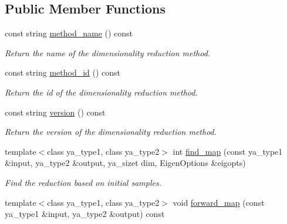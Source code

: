 \subsection*{Public Member Functions}
\begin{CompactItemize}
\item 
\hypertarget{class_y_a_m_d_s_reduce_a2}{
const string \hyperlink{class_y_a_m_d_s_reduce_a2}{method\_\-name} () const }
\label{class_y_a_m_d_s_reduce_a2}

\begin{CompactList}\small\item\em Return the name of the dimensionality reduction method. \item\end{CompactList}\item 
\hypertarget{class_y_a_m_d_s_reduce_a3}{
const string \hyperlink{class_y_a_m_d_s_reduce_a3}{method\_\-id} () const }
\label{class_y_a_m_d_s_reduce_a3}

\begin{CompactList}\small\item\em Return the id of the dimensionality reduction method. \item\end{CompactList}\item 
\hypertarget{class_y_a_m_d_s_reduce_a4}{
const string \hyperlink{class_y_a_m_d_s_reduce_a4}{version} () const }
\label{class_y_a_m_d_s_reduce_a4}

\begin{CompactList}\small\item\em Return the version of the dimensionality reduction method. \item\end{CompactList}\item 
template$<$class ya\_\-type1, class ya\_\-type2$>$ int \hyperlink{class_y_a_m_d_s_reduce_a5}{find\_\-map} (const ya\_\-type1 \&input, ya\_\-type2 \&output, ya\_\-sizet dim, Eigen\-Options \&eigopts)
\begin{CompactList}\small\item\em Find the reduction based on initial samples. \item\end{CompactList}\item 
\hypertarget{class_y_a_m_d_s_reduce_a6}{
template$<$class ya\_\-type1, class ya\_\-type2$>$ void \hyperlink{class_y_a_m_d_s_reduce_a6}{forward\_\-map} (const ya\_\-type1 \&input, ya\_\-type2 \&output) const }
\label{class_y_a_m_d_s_reduce_a6}


\end{CompactItemize}
